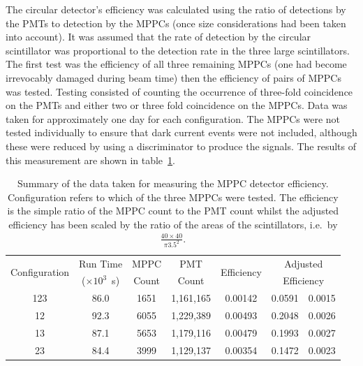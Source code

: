 The circular detector's efficiency was calculated using the ratio of detections by the PMTs to detection by the MPPCs (once size considerations had been taken into account). It was assumed that the rate of detection by the circular scintillator was proportional to the detection rate in the three large scintillators. The first test was the efficiency of all three remaining MPPCs (one had become irrevocably damaged during beam time) then the efficiency of pairs of MPPCs was tested. Testing consisted of counting the occurrence of three-fold coincidence on the PMTs and either two or three fold coincidence on the MPPCs. Data was taken for approximately one day for each configuration. The MPPCs were not tested individually to ensure that dark current events were not included, although these were reduced by using a discriminator to produce the signals. The results of this measurement are shown in table~\ref{tab:music2_eff}.

\begin{table}
  \begin{center}
    \begin{tabular}{c | c | c | c | c | r@{~\( \pm \)~}l}
      \multirow{2}{*}{Configuration} 
                     &  Run Time             &  MPPC   &  PMT        &  \multirow{2}{*}{Efficiency} 
                                                                                    &  \multicolumn{2}{c}{Adjusted}   \\
                     &  (\(\times 10^3\)~s)  &  Count  &  Count      &              &  \multicolumn{2}{c}{Efficiency} \\
      \hline
      123            &  86.0                 &  1651   &  1,161,165  &  0.00142     &  0.0591 & 0.0015  \\
      12             &  92.3                 &  6055   &  1,229,389  &  0.00493     &  0.2048 & 0.0026  \\
      13             &  87.1                 &  5653   &  1,179,116  &  0.00479     &  0.1993 & 0.0027  \\
      23             &  84.4                 &  3999   &  1,129,137  &  0.00354     &  0.1472 & 0.0023  \\
        
    \end{tabular}
  \end{center}
  \caption{Summary of the data taken for measuring the MPPC detector efficiency. Configuration refers to which of the three MPPCs were tested. The efficiency is the simple ratio of the MPPC count to the PMT count whilst the adjusted efficiency has been scaled by the ratio of the areas of the scintillators, i.e.\ by \( \frac{40\times40}{\pi3.5^2} \).}
  \label{tab:music2_eff}
\end{table}

